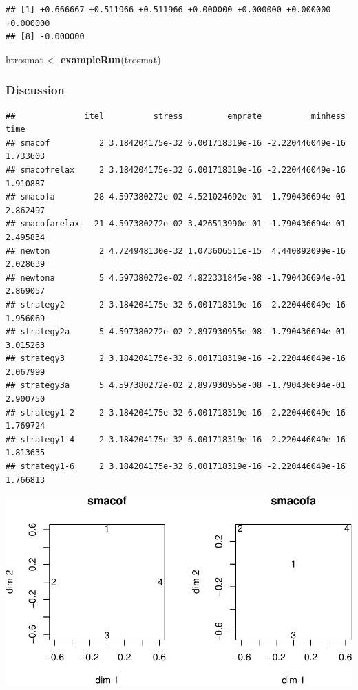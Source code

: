 \documentclass[
  12pt,
]{article}
\newenvironment{Shaded}{\begin{snugshade}}{\end{snugshade}}
\newcommand{\FunctionTok}[1]{\textcolor[rgb]{0.13,0.29,0.53}{\textbf{#1}}}
\newcommand{\NormalTok}[1]{#1}
\newcommand{\OtherTok}[1]{\textcolor[rgb]{0.56,0.35,0.01}{#1}}
\begin{document}
\begin{verbatim}
## [1] +0.666667 +0.511966 +0.511966 +0.000000 +0.000000 +0.000000 +0.000000
## [8] -0.000000
\end{verbatim}

\begin{Shaded}
\begin{Highlighting}[]
\NormalTok{htrosmat }\OtherTok{\textless{}{-}} \FunctionTok{exampleRun}\NormalTok{(trosmat)}
\end{Highlighting}
\end{Shaded}

\subsubsection{Discussion}\label{discussion}

\begin{verbatim}
##              itel          stress         emprate          minhess     time
## smacof          2 3.184204175e-32 6.001718319e-16 -2.220446049e-16 1.733603
## smacofrelax     2 3.184204175e-32 6.001718319e-16 -2.220446049e-16 1.910887
## smacofa        28 4.597380272e-02 4.521024692e-01 -1.790436694e-01 2.862497
## smacofarelax   21 4.597380272e-02 3.426513990e-01 -1.790436694e-01 2.495834
## newton          2 4.724948130e-32 1.073606511e-15  4.440892099e-16 2.028639
## newtona         5 4.597380272e-02 4.822331845e-08 -1.790436694e-01 2.869057
## strategy2       2 3.184204175e-32 6.001718319e-16 -2.220446049e-16 1.956069
## strategy2a      5 4.597380272e-02 2.897930955e-08 -1.790436694e-01 3.015263
## strategy3       2 3.184204175e-32 6.001718319e-16 -2.220446049e-16 2.067999
## strategy3a      5 4.597380272e-02 2.897930955e-08 -1.790436694e-01 2.900750
## strategy1-2     2 3.184204175e-32 6.001718319e-16 -2.220446049e-16 1.769724
## strategy1-4     2 3.184204175e-32 6.001718319e-16 -2.220446049e-16 1.813635
## strategy1-6     2 3.184204175e-32 6.001718319e-16 -2.220446049e-16 1.766813
\end{verbatim}

\includegraphics{sNewton_files/figure-latex/trosmatplot-1.pdf}
\end{document}
